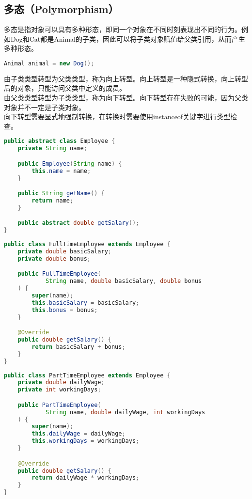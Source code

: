 \subsection{多态（Polymorphism）}

多态是指对象可以具有多种形态，即同一个对象在不同时刻表现出不同的行为。例如Dog和Cat都是Animal的子类，因此可以将子类对象赋值给父类引用，从而产生多种形态。

\vspace{-0.5cm}

\begin{lstlisting}[language=Java]
Animal animal = new Dog();
\end{lstlisting}

由子类类型转型为父类类型，称为向上转型。向上转型是一种隐式转换，向上转型后的对象，只能访问父类中定义的成员。\\

由父类类型转型为子类类型，称为向下转型。向下转型存在失败的可能，因为父类对象并不一定是子类对象。\\

向下转型需要显式地强制转换，在转换时需要使用instanceof关键字进行类型检查。\\


\begin{lstlisting}[language=Java]
public abstract class Employee {
    private String name;

    public Employee(String name) {
        this.name = name;
    }

    public String getName() {
        return name;
    }

    public abstract double getSalary();
}
\end{lstlisting}

\begin{lstlisting}[language=Java]
public class FullTimeEmployee extends Employee {
    private double basicSalary;
    private double bonus;

    public FullTimeEmployee(
            String name, double basicSalary, double bonus
    ) {
        super(name);
        this.basicSalary = basicSalary;
        this.bonus = bonus;
    }

    @Override
    public double getSalary() {
        return basicSalary + bonus;
    }
}
\end{lstlisting}

\begin{lstlisting}[language=Java]
public class PartTimeEmployee extends Employee {
    private double dailyWage;
    private int workingDays;

    public PartTimeEmployee(
            String name, double dailyWage, int workingDays
    ) {
        super(name);
        this.dailyWage = dailyWage;
        this.workingDays = workingDays;
    }

    @Override
    public double getSalary() {
        return dailyWage * workingDays;
    }
}
\end{lstlisting}

